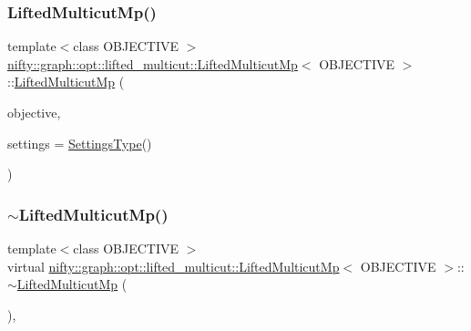 \subsubsection{\texorpdfstring{Lifted\+Multicut\+Mp()}{LiftedMulticutMp()}}
{\footnotesize\ttfamily template$<$class O\+B\+J\+E\+C\+T\+I\+VE $>$ \\
\hyperlink{classnifty_1_1graph_1_1opt_1_1lifted__multicut_1_1LiftedMulticutMp}{nifty\+::graph\+::opt\+::lifted\+\_\+multicut\+::\+Lifted\+Multicut\+Mp}$<$ O\+B\+J\+E\+C\+T\+I\+VE $>$\+::\hyperlink{classnifty_1_1graph_1_1opt_1_1lifted__multicut_1_1LiftedMulticutMp}{Lifted\+Multicut\+Mp} (\begin{DoxyParamCaption}\item[{const \hyperlink{classnifty_1_1graph_1_1opt_1_1lifted__multicut_1_1LiftedMulticutMp_a7946ba353b86ff043eff57fd75513b81}{Objective\+Type} \&}]{objective,  }\item[{const \hyperlink{structnifty_1_1graph_1_1opt_1_1lifted__multicut_1_1LiftedMulticutMp_1_1SettingsType}{Settings\+Type} \&}]{settings = {\ttfamily \hyperlink{structnifty_1_1graph_1_1opt_1_1lifted__multicut_1_1LiftedMulticutMp_1_1SettingsType}{Settings\+Type}()} }\end{DoxyParamCaption})}

\mbox{\label{classnifty_1_1graph_1_1opt_1_1lifted__multicut_1_1LiftedMulticutMp_a9870ccd84f056f6790b1ab3a52ae9587}} 
\subsubsection{\texorpdfstring{$\sim$\+Lifted\+Multicut\+Mp()}{~LiftedMulticutMp()}}
{\footnotesize\ttfamily template$<$class O\+B\+J\+E\+C\+T\+I\+VE $>$ \\
virtual \hyperlink{classnifty_1_1graph_1_1opt_1_1lifted__multicut_1_1LiftedMulticutMp}{nifty\+::graph\+::opt\+::lifted\+\_\+multicut\+::\+Lifted\+Multicut\+Mp}$<$ O\+B\+J\+E\+C\+T\+I\+VE $>$\+::$\sim$\hyperlink{classnifty_1_1graph_1_1opt_1_1lifted__multicut_1_1LiftedMulticutMp}{Lifted\+Multicut\+Mp} (\begin{DoxyParamCaption}{ }\end{DoxyParamCaption})\hspace{0.3cm}{\ttfamily [inline]}, {\ttfamily [virtual]}}



